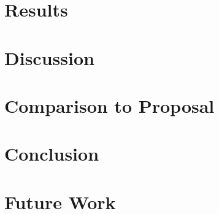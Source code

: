 \documentclass[11pt,letterpaper]{article}
\begin{document}
\section{Results}

\section{Discussion}


\section{Comparison to Proposal}


\section{Conclusion}

\section{Future Work}

\printbibliography

% 
% 
% 
% 
\end{document}

